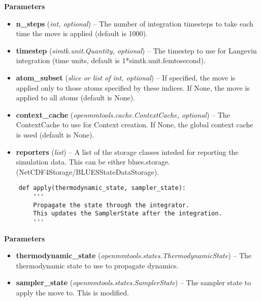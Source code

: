 \begin{description}
\item
    \textbf{Parameters}
\begin{itemize}
\item
  \textbf{n\_steps} (\emph{int, optional}) -- The number of integration
  timesteps to take each time the move is applied (default is 1000).
\item
  \textbf{timestep} (\emph{simtk.unit.Quantity, optional}) -- The
  timestep to use for Langevin integration (time units, default is
  1*simtk.unit.femtosecond).
\item
  \textbf{atom\_subset} (\emph{slice or list of int, optional}) -- If
  specified, the move is applied only to those atoms specified by these
  indices. If None, the move is applied to all atoms (default is None).
\item
  \textbf{context\_cache} (\emph{openmmtools.cache.ContextCache,
  optional}) -- The ContextCache to use for Context creation. If None,
  the global context cache is used (default is None).
\item
  \textbf{reporters} (\emph{list}) -- A list of the storage classes
  inteded for reporting the simulation data. This can be either
  blues.storage.(NetCDF4Storage/BLUESStateDataStorage).
\end{itemize}
\end{description}

\begin{description}
\item[Methods]
\item
    \begin{verbatim}
    def apply(thermodynamic_state, sampler_state):
        '''
        Propagate the state through the integrator.
        This updates the SamplerState after the integration.
        '''
    \end{verbatim}
    
    \begin{description}
    \item
        \textbf{Parameters}
    \begin{itemize}
    \item
      \textbf{thermodynamic\_state}
      (\emph{openmmtools.states.ThermodynamicState}) -- The thermodynamic
      state to use to propagate dynamics.
    \item
      \textbf{sampler\_state} (\emph{openmmtools.states.SamplerState}) --
      The sampler state to apply the move to. This is modified.
    \end{itemize}
    \end{description}
\end{description}

